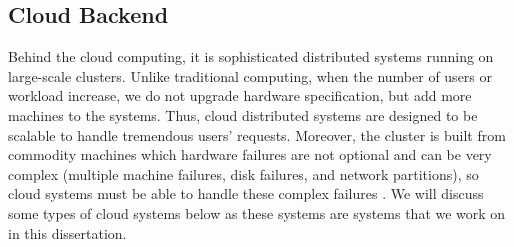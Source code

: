\subsection{Cloud Backend}

Behind the cloud computing, it is sophisticated distributed systems running on
large-scale clusters. Unlike traditional computing, when the number of users or
workload increase, we do not upgrade hardware specification, but add more
machines to the systems. Thus, cloud distributed systems are designed to be
scalable to handle tremendous users' requests. Moreover, the cluster is built
from commodity machines which hardware failures are not optional and can be very
complex (\eg multiple machine failures, disk failures, and network partitions),
so cloud systems must be able to handle these complex failures
\cite{Abadi09-Cloud, Gunawi+11-FaaS-TR, Hamilton07-Deploying}.  We will discuss
some types of cloud systems below as these systems are systems that we work on
in this dissertation.

